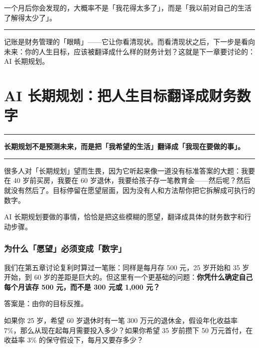 \documentclass[a4paper,11pt,oneside,fontset=none,UTF8,zihao=-4]{ctexbook}
\begin{document}
一个月后你会发现的，大概率不是「我花得太多了」，而是「我以前对自己的生活了解得太少了」。

\begin{center}{\color{dh-bronze}\rule{0.2\textwidth}{0.5pt}}\end{center}

记账是财务管理的「眼睛」------它让你看清现状。而看清现状之后，下一步是看向未来：你的人生目标，应该被翻译成什么样的财务计划？这就是下一章要讨论的：AI
长期规划。

\newpage

\chapter{AI
长期规划：把人生目标翻译成财务数字}\label{ai-ux957fux671fux89c4ux5212ux628aux4ebaux751fux76eeux6807ux7ffbux8bd1ux6210ux8d22ux52a1ux6570ux5b57}

\begin{center}{\color{dh-bronze}\rule{0.2\textwidth}{0.5pt}}\end{center}

\begin{dhquote}
\textbf{长期规划不是预测未来，而是把「我希望的生活」翻译成「我现在要做的事」。}
\end{dhquote}

\begin{center}{\color{dh-bronze}\rule{0.2\textwidth}{0.5pt}}\end{center}

很多人对「长期规划」望而生畏，因为它听起来像一道没有标准答案的大题：我要在
40 岁前买房，我要在 60
岁退休，我要给孩子存一笔教育金------然后呢？然后就没有然后了。目标停留在愿望层面，因为没有人和方法帮你把它拆解成可执行的数字。

AI
长期规划要做的事情，恰恰是把这些模糊的愿望，翻译成具体的财务数字和行动步骤。

\subsection{为什么「愿望」必须变成「数字」}\label{ux4e3aux4ec0ux4e48ux613fux671bux5fc5ux987bux53d8ux6210ux6570ux5b57}

我们在第五章讨论复利时算过一笔账：同样是每月存 500 元，25 岁开始和 35
岁开始，到 60
岁的差距是巨大的。但这里有一个更基础的问题：\textbf{你凭什么确定自己每个月该存
500 元，而不是 300 元或 1,000 元？}

答案是：由你的目标反推。

如果你 25 岁，希望 60 岁退休时有一笔 300 万元的退休金，假设年化收益率
7\%，那么从现在起每月需要投入多少？如果你希望 35 岁前攒下 50
万元首付，在收益率 3\% 的保守假设下，每月又要存多少？
\end{document}
